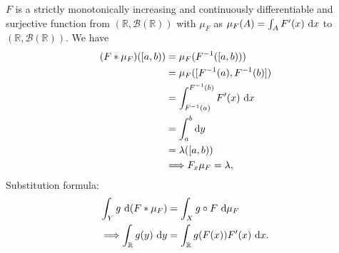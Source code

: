 \documentclass[../../note.tex]{subfiles}
\begin{document}
\begin{example}
    $F$ is a strictly monotonically increasing and continuously differentiable and surjective function from $(\mathbb{R}, \mathcal{B}(\mathbb{R}))$ with $\mu_F$ as $\mu_F(A) = \int_A F'(x)~{\rm d}x$ to $(\mathbb{R}, \mathcal{B}(\mathbb{R}))$. We have
    \begin{align}
        (F * \mu_F)([a,b))
        &= \mu_F(F^{-1}([a,b))) \\
        &= \mu_F([F^{-1}(a), F^{-1}(b)]) \\
        &= \int_{F^{-1}(a)}^{F^{-1}(b)} F'(x)~{\rm d}x \\
        &= \int_a^b {\rm d}y \\
        &= \lambda([a,b)) \\
        &\Longrightarrow F_x \mu_F = \lambda,
    \end{align}
    Substitution formula:
    \begin{align}
        \int_Y g~{\rm d}(F * \mu_F)
        &= \int_X g \circ F~{\rm d}\mu_F \\
        \Longrightarrow \int_{\mathbb{R}} g(y)~{\rm d}y 
        &= \int_{\mathbb{R}} g(F(x)) F'(x)~{\rm d}x.
    \end{align}
\end{example}
\end{document}
